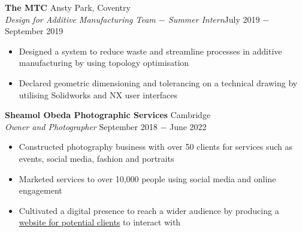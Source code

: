 \documentclass[8pt]{article}
\begin{document}
\textbf{The MTC} \hfill Ansty Park, Coventry \\
\textit{Design for Additive Manufacturing Team $-$ Summer Intern}\hfill July 2019 $-$ September 2019
\begin{itemize}
    \item Designed a system to reduce waste and streamline processes in additive manufacturing by using topology optimisation
    \item Declared geometric dimensioning and tolerancing on a technical drawing by utilising Solidworks and NX user interfaces
\end{itemize} \medskip

\textbf{Sheamol Obeda Photographic Services} \hfill Cambridge\\
\textit{Owner and Photographer} \hfill September 2018 $-$ June 2022
\begin{itemize}
    \item Constructed photography business with over 50 clients for services such as events, social media, fashion and portraits
    \item Marketed services to over 10,000 people using social media and online engagement
    \item Cultivated a digital presence to reach a wider audience by producing a \href{www.sheamol.com}{website for potential clients} to interact with 
\end{itemize} \medskip


\vspace{-0.75\baselineskip}
\hrulefill
\vspace{-0.75\baselineskip}
\end{document}
